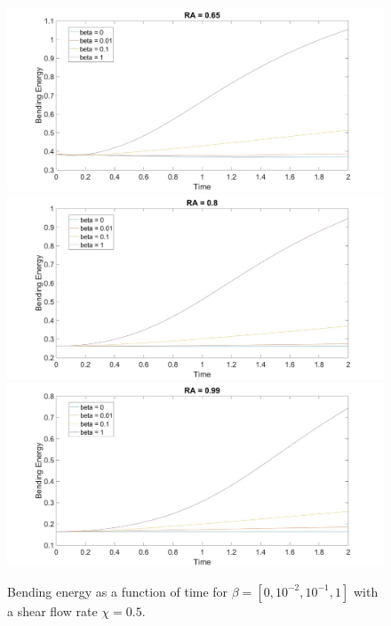 \documentclass[aps,prl,showpacs]{revtex4}
\begin{document}
 \begin{figure}
 	\centering
 	\includegraphics[width=.9\textwidth]{figures/BE4.jpg}
 	\includegraphics[width=.9\textwidth]{figures/BE5.jpg}
 	\includegraphics[width=.9\textwidth]{figures/BE6.jpg}
 	\caption{Bending energy as a function of time for $\beta = [0, 10^{-2},10^{-1}, 1]$ with a shear flow rate $\chi = 0.5$.}
 	\label{Shear0}
 \end{figure}
 
\end{document}
